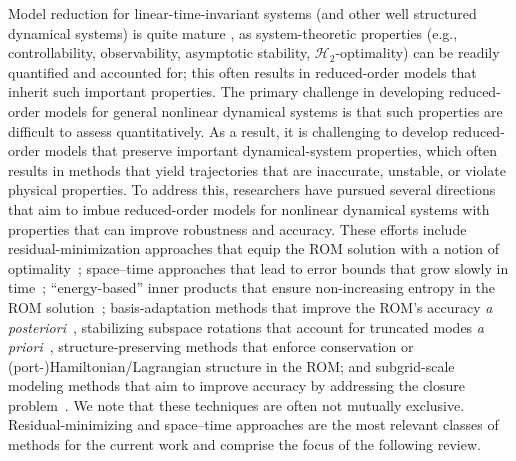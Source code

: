 \documentclass[3p,computermodern,10pt]{elsarticle}
\begin{document}
Model reduction for linear-time-invariant systems (and other well structured
dynamical systems) is quite mature
\cite{wilcox_benner_rev,moore,roberts,GugercinIRKA}, as system-theoretic properties (e.g., controllability,
observability, asymptotic stability, $\mathcal H_2$-optimality) can be readily
quantified and accounted for; this often results in
reduced-order models that inherit such important properties.  The primary
challenge in
developing reduced-order models for general nonlinear dynamical systems is
that such properties are difficult to assess quantitatively. As a result, it
is challenging to develop reduced-order models that preserve important
dynamical-system properties, which often results in methods that yield
trajectories that are
inaccurate, unstable, or violate physical properties.  To address this, researchers have pursued several directions that
aim to imbue reduced-order models for nonlinear
dynamical systems with properties that can improve robustness and accuracy.
These
efforts include residual-minimization approaches that equip the ROM solution with a notion of optimality~\cite{carlberg_lspg,carlberg_gnat,legresley_1,legresley_2,legresley_3,bui_resmin_steady,bui_unsteady,rovas_thesis,carlberg_thesis,bui_thesis,l1};
space--time approaches that lead to error bounds that grow slowly in time~\cite{choi_stlspg,constantine_strom,URBAN2012203,Yano2014ASC,benner_st};
``energy-based'' inner
products that ensure non-increasing entropy in the ROM
solution~\cite{rowley_pod_energyproj,Kalashnikova_sand2014,chan2019entropy};
basis-adaptation methods that improve the ROM's accuracy \textit{a
posteriori}~\cite{carlberg_hadaptation,adeim_peherstorfer,etter2019online}, stabilizing subspace rotations that account for truncated modes \textit{a priori}~\cite{basis_rotation}, structure-preserving
methods that enforce conservation \cite{carlberg_conservative_rom} or
(port-)Hamiltonian/Lagrangian structure
\cite{LALL2003304,carlberg2012spd,structurePreserveBeattie,chaturantabut2016structure,farhat2014dimensional} in the ROM; and subgrid-scale
modeling methods that aim to improve accuracy by addressing the closure
problem~\cite{san_iliescu_geostrophic,iliescu_pod_eddyviscosity,iliescu_vms_pod_ns,Bergmann_pod_vms,iliescu_ciazzo_residual_rom,Wang_ROM_thesis,wentland_apg,Wang:269133,San2018}.
We note that these techniques are often not mutually exclusive.
Residual-minimizing and space--time approaches are the most relevant classes of
methods for the current work and comprise the focus of the following review.
\end{document}
